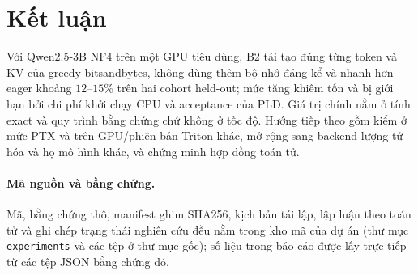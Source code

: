 \documentclass[a4paper,11pt]{article}
\begin{document}
\section{Kết luận}
Với Qwen2.5-3B NF4 trên một GPU tiêu dùng, B2 tái tạo đúng từng token và KV của greedy bitsandbytes, không dùng thêm bộ nhớ đáng kể và nhanh hơn eager khoảng $12$--$15\%$ trên hai cohort held-out; mức tăng khiêm tốn và bị giới hạn bởi chi phí khởi chạy CPU và acceptance của PLD. Giá trị chính nằm ở tính exact và quy trình bằng chứng chứ không ở tốc độ. Hướng tiếp theo gồm kiểm ở mức PTX và trên GPU/phiên bản Triton khác, mở rộng sang backend lượng tử hóa và họ mô hình khác, và chứng minh hợp đồng toán tử.

\paragraph{Mã nguồn và bằng chứng.} Mã, bằng chứng thô, manifest ghim SHA256, kịch bản tái lập, lập luận theo toán tử và ghi chép trạng thái nghiên cứu đều nằm trong kho mã của dự án (thư mục \texttt{experiments} và các tệp ở thư mục gốc); số liệu trong báo cáo được lấy trực tiếp từ các tệp JSON bằng chứng đó.



\end{document}
